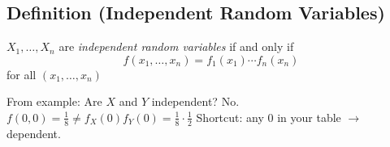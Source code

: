 \begin{defbox}
    \subsection{Definition (Independent Random Variables)}
    $ X_1,\ldots,X_n $ are \emph{independent random variables} if
    and only if
    \[ f(x_1,\ldots ,x_n)=f_1(x_1)\cdots f_n(x_n) \]
    for all $ (x_1,\ldots,x_n) $
\end{defbox}
From example: Are $ X $ and $ Y $ independent? No.
$ f(0,0)=\frac{1}{8} \neq f_X(0)f_Y(0)=\frac{1}{8}\cdot \frac{1}{2} $
Shortcut: any $ 0 $ in your table $ \rightarrow $ dependent.
